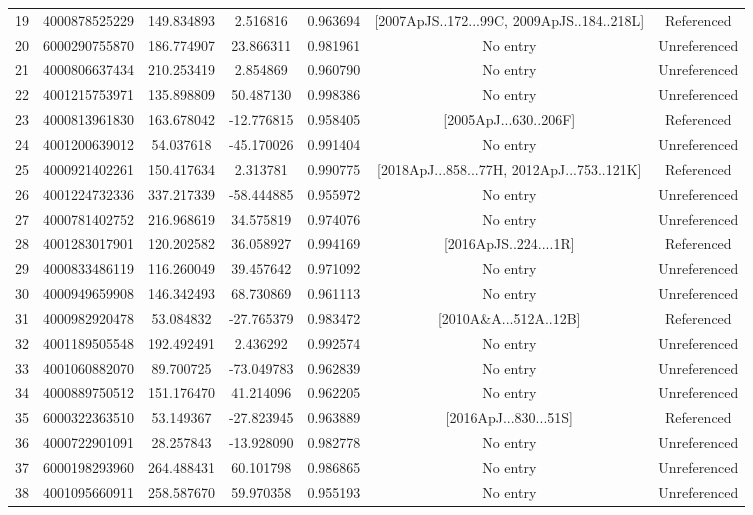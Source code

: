 {\begin{table}
{\begin{tabular}{|c|c|c|c|c|c|c|}
	  19 & 4000878525229 & 149.834893 & 2.516816 & 0.963694 & [2007ApJS..172...99C, 2009ApJS..184..218L] & Referenced \\
	  20 & 6000290755870 & 186.774907 & 23.866311 & 0.981961 & No entry & Unreferenced \\
	  21 & 4000806637434 & 210.253419 & 2.854869 & 0.960790 & No entry & Unreferenced \\
	  22 & 4001215753971 & 135.898809 & 50.487130 & 0.998386 & No entry & Unreferenced \\
	  23 & 4000813961830 & 163.678042 & -12.776815 & 0.958405 & [2005ApJ...630..206F] & Referenced \\
	  24 & 4001200639012 & 54.037618 & -45.170026 & 0.991404 & No entry & Unreferenced \\
	  25 & 4000921402261 & 150.417634 & 2.313781 & 0.990775 & [2018ApJ...858...77H, 2012ApJ...753..121K] & Referenced \\
	  26 & 4001224732336 & 337.217339 & -58.444885 & 0.955972 & No entry & Unreferenced \\
	  27 & 4000781402752 & 216.968619 & 34.575819 & 0.974076 & No entry & Unreferenced \\
	  28 & 4001283017901 & 120.202582 & 36.058927 & 0.994169 & [2016ApJS..224....1R] & Referenced \\
	  29 & 4000833486119 & 116.260049 & 39.457642 & 0.971092 & No entry & Unreferenced \\
	  30 & 4000949659908 & 146.342493 & 68.730869 & 0.961113 & No entry & Unreferenced \\
	  31 & 4000982920478 & 53.084832 & -27.765379 & 0.983472 &  [2010A\&A...512A..12B] & Referenced \\
	  32 & 4001189505548 & 192.492491 & 2.436292 & 0.992574 & No entry & Unreferenced \\
	  33 & 4001060882070 & 89.700725 & -73.049783 & 0.962839 & No entry & Unreferenced \\
	  34 & 4000889750512 & 151.176470 & 41.214096 & 0.962205 & No entry & Unreferenced \\
	  35 & 6000322363510 & 53.149367 & -27.823945 & 0.963889 & [2016ApJ...830...51S] & Referenced \\
	  36 & 4000722901091 & 28.257843 & -13.928090 & 0.982778 & No entry & Unreferenced \\
	  37 & 6000198293960 & 264.488431 & 60.101798 & 0.986865 & No entry & Unreferenced \\
	  38 & 4001095660911 & 258.587670 & 59.970358 & 0.955193 & No entry & Unreferenced \\

\end{tabular}}
\end{table}}
